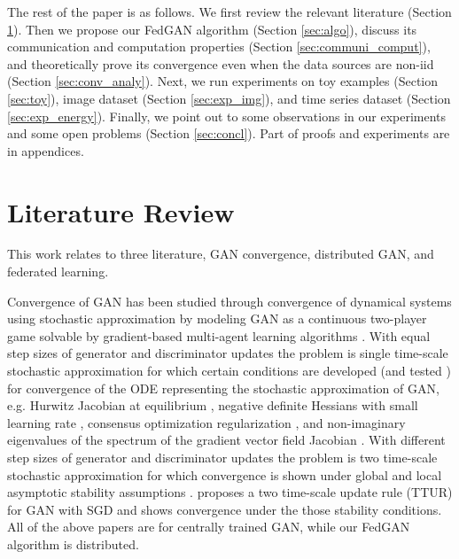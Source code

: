 \documentclass{article}
\begin{document}
The rest of the paper is as follows. We first review the relevant literature (Section \ref{sec:liter_rev}). Then we propose our FedGAN algorithm (Section \ref{sec:algo}), discuss its communication and computation properties (Section \ref{sec:communi_comput}), and theoretically prove its convergence even when the data sources are non-iid (Section \ref{sec:conv_analy}). Next, we run experiments on toy examples (Section \ref{sec:toy}), image dataset (Section \ref{sec:exp_img}), and time series dataset (Section \ref{sec:exp_energy}). Finally, we point out to some observations in our experiments and some open problems (Section \ref{sec:concl}). Part of proofs and experiments are in appendices.
	
\section{Literature Review}
\label{sec:liter_rev}
This work relates to three literature, GAN convergence, distributed GAN, and federated learning.

Convergence of GAN has been studied through convergence of dynamical systems using stochastic approximation by modeling GAN as a continuous two-player game solvable by gradient-based multi-agent learning algorithms \citep{chasnov2019convergence}. With equal step sizes of generator and discriminator updates the problem is single time-scale stochastic approximation \citep{konda2004convergence} for which  certain conditions are developed (and tested \citep{mescheder2018training}) for convergence of the ODE representing the stochastic approximation of GAN, e.g. Hurwitz Jacobian at equilibrium \citep{khalil2002nonlinear}, negative definite Hessians with small learning rate
\citep{nowozin2016f,ratliff2013characterization}, consensus optimization regularization  \citep{nagarajan2017gradient}, and non-imaginary eigenvalues of the spectrum of the gradient vector field Jacobian \citep{mescheder2017numerics}. With different step sizes of generator and discriminator updates the problem is two time-scale stochastic approximation  \citep{borkar1997stochastic} for which convergence is shown under  global \citep{borkar1997stochastic} and local asymptotic stability assumptions  \citep{karmakar2017two,borkar2009stochastic}. 
\citep{heusel2017gans} proposes a two time-scale update rule (TTUR) for GAN with SGD and shows convergence under the those stability conditions. All of the above papers are for centrally trained GAN, while our FedGAN algorithm is distributed.
\end{document}
